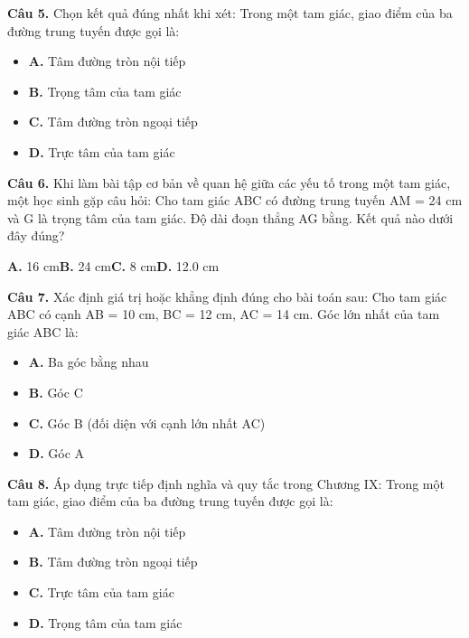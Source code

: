\documentclass[11pt,a4paper]{article}
\begin{document}
\textbf{\color{primary} Câu 5.} Chọn kết quả đúng nhất khi xét: Trong một tam giác, giao điểm của ba đường trung tuyến được gọi là:\par
\begin{itemize}\setlength{\itemsep}{1pt}\setlength{\parskip}{0pt}
  \item[] \textbf{A.} Tâm đường tròn nội tiếp
  \item[] \textbf{B.} Trọng tâm của tam giác
  \item[] \textbf{C.} Tâm đường tròn ngoại tiếp
  \item[] \textbf{D.} Trực tâm của tam giác
\end{itemize}\vspace{2pt}
\textbf{\color{primary} Câu 6.} Khi làm bài tập cơ bản về quan hệ giữa các yếu tố trong một tam giác, một học sinh gặp câu hỏi: Cho tam giác ABC có đường trung tuyến AM = 24 cm và G là trọng tâm của tam giác. Độ dài đoạn thẳng AG bằng. Kết quả nào dưới đây đúng?\par
\hspace*{1.5em}\textbf{A.} 16 cm\quad\quad \textbf{B.} 24 cm\quad\quad \textbf{C.} 8 cm\quad\quad \textbf{D.} 12.0 cm\par\vspace{2pt}
\textbf{\color{primary} Câu 7.} Xác định giá trị hoặc khẳng định đúng cho bài toán sau: Cho tam giác ABC có cạnh AB = 10 cm, BC = 12 cm, AC = 14 cm. Góc lớn nhất của tam giác ABC là:\par
\begin{itemize}\setlength{\itemsep}{1pt}\setlength{\parskip}{0pt}
  \item[] \textbf{A.} Ba góc bằng nhau
  \item[] \textbf{B.} Góc C
  \item[] \textbf{C.} Góc B (đối diện với cạnh lớn nhất AC)
  \item[] \textbf{D.} Góc A
\end{itemize}\vspace{2pt}
\textbf{\color{primary} Câu 8.} Áp dụng trực tiếp định nghĩa và quy tắc trong Chương IX: Trong một tam giác, giao điểm của ba đường trung tuyến được gọi là:\par
\begin{itemize}\setlength{\itemsep}{1pt}\setlength{\parskip}{0pt}
  \item[] \textbf{A.} Tâm đường tròn nội tiếp
  \item[] \textbf{B.} Tâm đường tròn ngoại tiếp
  \item[] \textbf{C.} Trực tâm của tam giác
  \item[] \textbf{D.} Trọng tâm của tam giác
\end{itemize}\vspace{2pt}
\end{document}
